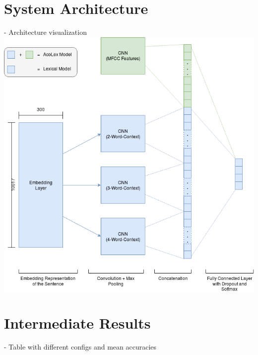 \documentclass[a0,landscape]{a0poster}
\begin{document}
\begin{multicols}{3}

\section*{System Architecture}
- Architecture visualization\\
\includegraphics[width=\linewidth]{Bilder/CNN_Diagram.png}


\color{Black} %

\section*{Intermediate Results}
- Table with different configs and mean accuracies\\


\end{multicols}
\end{document}
